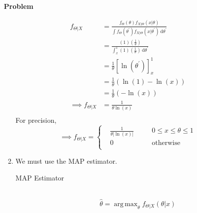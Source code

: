 \documentclass[12pt]{article}
\newenvironment{Ex}{\textbf{Problem}\vspace{.75em}\\}{}
\newcommand{\dd}[1]{\:\mathrm{d}{#1}}
\DeclareMathOperator*{\argmax}{arg\,max}
\begin{document}
\begin{enumerate}
\begin{Ex}
\begin{solution}
\begin{enumerate}
        \begin{equation}
          \label{eq:4a-presol}
          \begin{aligned}
            f_{\Theta|X} &=
            \frac{f_{\Theta}(\theta)f_{X|\Theta}(x|\theta)} {\int
              f_{\Theta}(\theta^{\prime})f_{X|\Theta}(x|\theta^{\prime})
              \dd{\theta^{\prime}}} \\
            &= \frac{(1)(\frac{1}{\theta})}{\int_x^1
                (1)(\frac{1}{\theta}) \dd{\theta^{\prime}}} \\
            &= \frac{1}{\theta}[\ln(\theta^{\prime})]_x^1 \\
            &= \frac{1}{\theta}(\ln(1) - \ln(x)) \\
            &= \frac{1}{\theta}(-\ln(x)) \\
            \implies f_{\Theta|X}&= \frac{1}{\theta\ln(x)} \\
          \end{aligned}
        \end{equation}
        For precision,
        \begin{equation}
          \label{eq:4a-sol}
            \implies f_{\Theta|X} = \left\{
              \begin{aligned}
                & \frac{1}{\theta|\ln(x)|}
                &&\quad 0\le x\le\theta\le 1 \\
                & 0 &&\quad\text{otherwise} \\
              \end{aligned} \right.
        \end{equation}
      \item We must use the MAP estimator.
        \begin{mdframed}[backgroundcolor=silver]
          \begin{description}
          \item[MAP Estimator] \hfill \\
            $$\hat{\theta} = \argmax_{\theta}
            f_{\Theta|X}(\theta|x)$$


\end{description}
\end{mdframed}
\end{enumerate}
\end{solution}
\end{Ex}
\end{enumerate}
\end{document}
